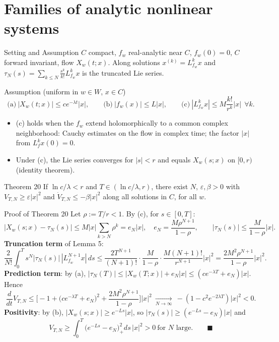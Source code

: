 \documentclass[10pt,aspectratio=169]{beamer}
\begin{document}
\section{Families of analytic nonlinear systems}

\begin{frame}{Setting and Assumption}
$C$ compact, $f_w$ real-analytic near $C$, $f_w(0)=0$, $C$ forward invariant, flow $X_w(t;x)$. Along solutions $x^{(k)}=L_{f_w}^kx$ and $\tau_N(s)=\sum_{k\le N}\frac{s^k}{k!}L_{f_w}^kx$ is the \alert{truncated Lie series}.
\begin{block}{Assumption (uniform in $w\in W$, $x\in C$)}
\[
\text{(a)}\ |X_w(t;x)|\le ce^{-\lambda t}|x|,\qquad \text{(b)}\ |f_w(x)|\le L|x|,\qquad \text{(c)}\ |L_{f_w}^kx|\le M\frac{k!}{r^k}|x|\ \ \forall k .
\]
\end{block}
\begin{itemize}
\item (c) holds when the $f_w$ extend holomorphically to a common complex neighborhood: Cauchy estimates on the flow in complex time; the factor $|x|$ from $L_f^kx(0)=0$.
\item Under (c), the Lie series converges for $|s|<r$ and equals $X_w(s;x)$ on $[0,r)$ (identity theorem).
\end{itemize}
\begin{block}{Theorem 20}
If $\ln c/\lambda<r$ and $T\in(\ln c/\lambda,r)$, there exist $N$, $\varepsilon,\beta>0$ with $V_{T,N}\ge\varepsilon|x|^2$ and $\dot V_{T,N}\le-\beta|x|^2$ along all solutions in $C$, for all $w$.
\end{block}
\end{frame}

\begin{frame}{Proof of Theorem 20}
Let $\rho:=T/r<1$. By (c), for $s\in[0,T]$:
\[
|X_w(s;x)-\tau_N(s)|\le M|x|\sum_{k>N}\rho^k=e_N|x|,\quad e_N=\frac{M\rho^{N+1}}{1-\rho},\qquad |\tau_N(s)|\le\frac{M}{1-\rho}|x| .
\]
\textbf{Truncation term} of Lemma 5:
\[
\frac{2}{N!}\int_0^Ts^N|\tau_N(s)|\,|L_{f_w}^{N+1}x|\,ds\le\frac{2T^{N+1}}{(N+1)!}\cdot\frac{M}{1-\rho}\cdot\frac{M(N+1)!}{r^{N+1}}|x|^2=\frac{2M^2\rho^{N+1}}{1-\rho}|x|^2 .
\]
\textbf{Prediction term}: by (a), $|\tau_N(T)|\le|X_w(T;x)|+e_N|x|\le(ce^{-\lambda T}+e_N)|x|$. Hence
\[
\frac{d}{dt}V_{T,N}\le\Big[-1+\big(ce^{-\lambda T}+e_N\big)^2+\frac{2M^2\rho^{N+1}}{1-\rho}\Big]|x|^2\ \xrightarrow[N\to\infty]{}\ -(1-c^2e^{-2\lambda T})|x|^2<0 .
\]
\textbf{Positivity}: by (b), $|X_w(s;x)|\ge e^{-Ls}|x|$, so $|\tau_N(s)|\ge(e^{-Ls}-e_N)|x|$ and
\[
V_{T,N}\ge\int_0^T\big(e^{-Ls}-e_N\big)_+^2ds\,|x|^2>0\ \text{for }N\text{ large.}\qquad\blacksquare
\]
\end{frame}
\end{document}
